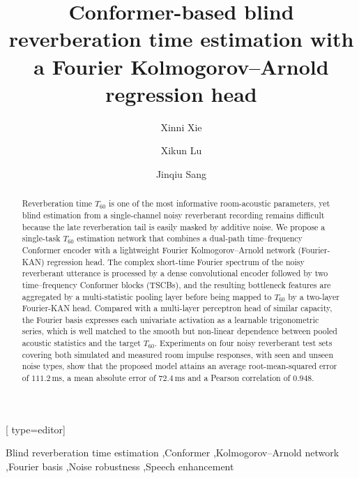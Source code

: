 \documentclass[a4paper,fleqn]{cas-dc}
\begin{document}
\let\WriteBookmarks\relax
\def\floatpagepagefraction{1}
\def\textpagefraction{.001}


\title[mode=title]{Conformer-based blind reverberation time estimation with a Fourier Kolmogorov--Arnold regression head}

\author[1]{Xinni Xie}[%
  type=editor]

\author[1]{Xikun Lu}

\author[1]{Jinqiu Sang}
\cormark[1]



\begin{abstract}
Reverberation time $T_{60}$ is one of the most informative room-acoustic
parameters, yet blind estimation from a single-channel noisy reverberant
recording remains difficult because the late reverberation tail is easily
masked by additive noise. We propose a single-task $T_{60}$ estimation
network that combines a dual-path time--frequency Conformer encoder with
a lightweight Fourier Kolmogorov--Arnold network (Fourier-KAN) regression
head. The complex short-time Fourier
spectrum of the noisy reverberant utterance is processed by a dense
convolutional encoder followed by two time--frequency Conformer blocks
(TSCBs), and the resulting bottleneck features are aggregated by a
multi-statistic pooling layer before being mapped to $T_{60}$ by a
two-layer Fourier-KAN head. Compared with a multi-layer perceptron head of
similar capacity, the Fourier basis expresses each univariate activation as
a learnable trigonometric series, which is well matched to the smooth but
non-linear dependence between pooled acoustic statistics and the target
$T_{60}$. Experiments on four noisy reverberant test sets covering both
simulated and measured room impulse responses, with seen and unseen noise
types, show that the proposed model attains an average root-mean-squared
error of $111.2$\,ms, a mean absolute error of $72.4$\,ms and a Pearson
correlation of $0.948$.
\end{abstract}

\begin{keywords}
Blind reverberation time estimation \sep Conformer \sep Kolmogorov--Arnold
network \sep Fourier basis \sep Noise robustness \sep Speech enhancement
\end{keywords}
\end{document}
